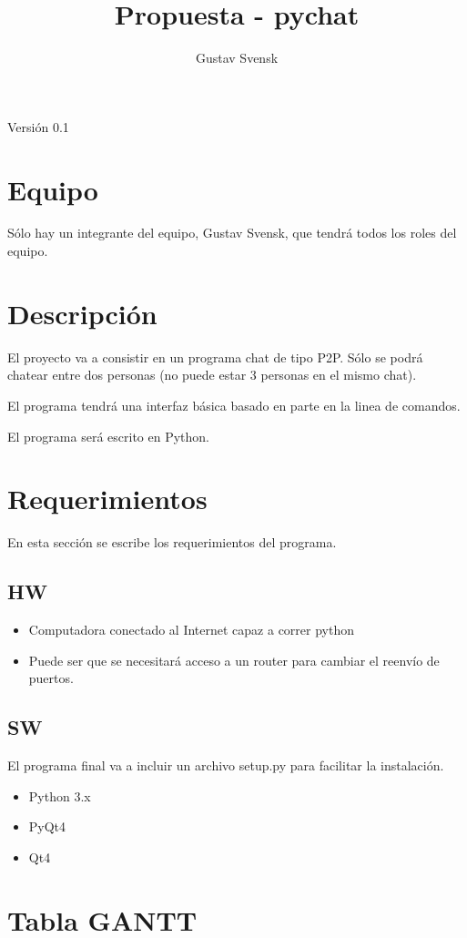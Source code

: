 \documentclass[a4paper, 12pt]{article}
\title{Propuesta - pychat}
\author{Gustav Svensk}
\begin{document}
\cfoot{\thepage}
\renewcommand{\headrulewidth}{0.4pt}


\maketitle
\thispagestyle{empty}
\begin{center}
        {\large Versión 0.1}
\end{center}
\newpage
\setcounter{page}{1}

\section{Equipo}
Sólo hay un integrante del equipo, Gustav Svensk, que tendrá todos los roles del
equipo.
\section{Descripción}
El proyecto va a consistir en un programa chat de tipo P2P. Sólo se
podrá chatear entre dos personas (no puede estar 3 personas en el mismo
chat).

El programa tendrá una interfaz básica basado en parte en la linea de comandos.

El programa será escrito en Python.
\section{Requerimientos}
En esta sección se escribe los requerimientos del programa.
\subsection{HW}
\begin{itemize}
        \item Computadora conectado al Internet capaz a correr python
        \item Puede ser que se necesitará acceso a un router para cambiar el
                reenvío de puertos.
\end{itemize}
\subsection{SW}
El programa final va a incluir un archivo setup.py para facilitar la
instalación.
\begin{itemize}
        \item Python 3.x
        \item PyQt4
        \item Qt4
\end{itemize}
\section{Tabla GANTT}
\end{document}
